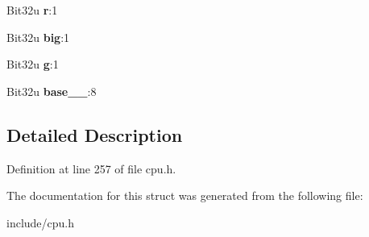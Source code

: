 \begin{DoxyCompactItemize}
\item 
\hypertarget{structS__Descriptor_ab85713407b929b2057bd5d270dd42c3b}{Bit32u {\bfseries r}\-:1}\label{structS__Descriptor_ab85713407b929b2057bd5d270dd42c3b}

\item 
\hypertarget{structS__Descriptor_a40a0bb2a57f2dee9120b8403e6f47a34}{Bit32u {\bfseries big}\-:1}\label{structS__Descriptor_a40a0bb2a57f2dee9120b8403e6f47a34}

\item 
\hypertarget{structS__Descriptor_a96e1d950804c1ae5592890f340a1fe97}{Bit32u {\bfseries g}\-:1}\label{structS__Descriptor_a96e1d950804c1ae5592890f340a1fe97}

\item 
\hypertarget{structS__Descriptor_a4056275d6cc2af40cd58a1cf0da07c1d}{Bit32u {\bfseries base\-\_\-\_}\-:8}\label{structS__Descriptor_a4056275d6cc2af40cd58a1cf0da07c1d}

\end{DoxyCompactItemize}


\subsection{Detailed Description}


Definition at line 257 of file cpu.\-h.



The documentation for this struct was generated from the following file\-:\begin{DoxyCompactItemize}
\item 
include/cpu.\-h\end{DoxyCompactItemize}
